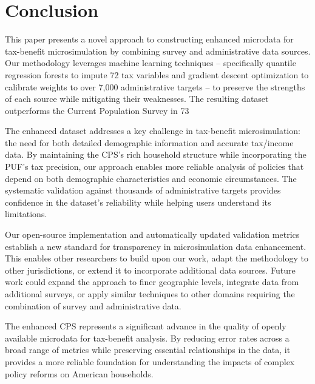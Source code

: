\section{Conclusion}

This paper presents a novel approach to constructing enhanced microdata for tax-benefit microsimulation by combining survey and administrative data sources. Our methodology leverages machine learning techniques – specifically quantile regression forests to impute 72 tax variables and gradient descent optimization to calibrate weights to over 7,000 administrative targets – to preserve the strengths of each source while mitigating their weaknesses. The resulting dataset outperforms the Current Population Survey in 73%

The enhanced dataset addresses a key challenge in tax-benefit microsimulation: the need for both detailed demographic information and accurate tax/income data. By maintaining the CPS's rich household structure while incorporating the PUF's tax precision, our approach enables more reliable analysis of policies that depend on both demographic characteristics and economic circumstances. The systematic validation against thousands of administrative targets provides confidence in the dataset's reliability while helping users understand its limitations.

Our open-source implementation and automatically updated validation metrics establish a new standard for transparency in microsimulation data enhancement. This enables other researchers to build upon our work, adapt the methodology to other jurisdictions, or extend it to incorporate additional data sources. Future work could expand the approach to finer geographic levels, integrate data from additional surveys, or apply similar techniques to other domains requiring the combination of survey and administrative data.

The enhanced CPS represents a significant advance in the quality of openly available microdata for tax-benefit analysis. By reducing error rates across a broad range of metrics while preserving essential relationships in the data, it provides a more reliable foundation for understanding the impacts of complex policy reforms on American households.